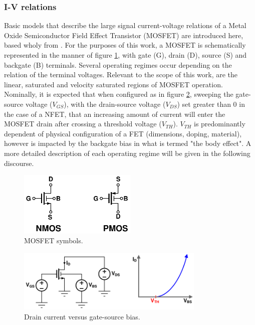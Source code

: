 	\subsubsection{I-V relations}\label{sec:mos_iv}
	Basic models that describe the large signal current-voltage relations of a Metal Oxide Semiconductor Field Effect Transistor (MOSFET) are introduced here, based wholy from \cite{razavi_2017}. For the purposes of this work, a MOSFET is schematically represented in the manner of figure \ref{fig:mos_symbols}, with gate (G), drain (D), source (S) and backgate (B) terminals. Several operating regimes occur depending on the relation of the terminal voltages. Relevant to the scope of this work, are the linear, saturated and velocity saturated regions of MOSFET operation. Nominally, it is expected that when configured as in figure \ref{fig:vgs_sweep}, sweeping the gate-source voltage ($V_{GS}$), with the drain-source voltage ($V_{DS}$) set greater than 0 in the case of a NFET, that an increasing amount of current will enter the MOSFET drain after crossing a threshold voltage ($V_{TH}$). $V_{TH}$ is predominantly dependent of physical configuration of a FET (dimensions, doping, material), however is impacted by the backgate bias in what is termed "the body effect". A more detailed description of each operating regime will be given in the following discourse.

			\begin{figure}[htb!]
			        \centering
			        \includegraphics[width=0.5\textwidth, angle=0]{./figs/theory/fet_symbols}
			    \caption{MOSFET symbols.}
			    \label{fig:mos_symbols}
			\end{figure}

			\begin{figure}[htb!]
			        \centering
			        \includegraphics[width=0.8\textwidth, angle=0]{./figs/theory/vgs_sweep}
			    \caption{Drain current versus gate-source bias.}
			    \label{fig:vgs_sweep}
			\end{figure}


